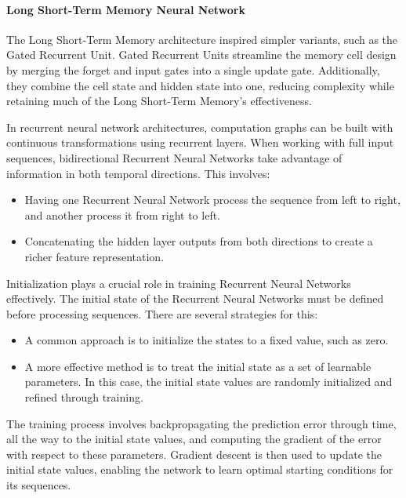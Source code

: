\paragraph*{Long Short-Term Memory Neural Network}
The Long Short-Term Memory architecture inspired simpler variants, such as the Gated Recurrent Unit. 
Gated Recurrent Units streamline the memory cell design by merging the forget and input gates into a single update gate.
Additionally, they combine the cell state and hidden state into one, reducing complexity while retaining much of the Long Short-Term Memory's effectiveness.

In recurrent neural network architectures, computation graphs can be built with continuous transformations using recurrent layers. 
When working with full input sequences, bidirectional Recurrent Neural Networks take advantage of information in both temporal directions. 
This involves:
\begin{itemize}
    \item Having one Recurrent Neural Network process the sequence from left to right, and another process it from right to left.
    \item Concatenating the hidden layer outputs from both directions to create a richer feature representation.
\end{itemize}

Initialization plays a crucial role in training Recurrent Neural Networks effectively. 
The initial state of the Recurrent Neural Networks must be defined before processing sequences. 
There are several strategies for this:
\begin{itemize}
    \item A common approach is to initialize the states to a fixed value, such as zero.
    \item A more effective method is to treat the initial state as a set of learnable parameters. 
        In this case, the initial state values are randomly initialized and refined through training.
\end{itemize}
The training process involves backpropagating the prediction error through time, all the way to the initial state values, and computing the gradient of the error with respect to these parameters. 
Gradient descent is then used to update the initial state values, enabling the network to learn optimal starting conditions for its sequences.